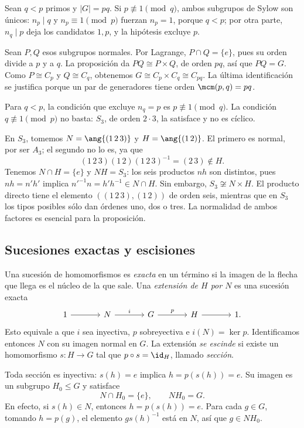 \begin{ejem}
Sean $q<p$ primos y $|G|=pq$. Si \mbox{$p\not\equiv1\pmod q$}, ambos subgrupos de Sylow son únicos: $n_p\mid q$ y $n_p\equiv1\pmod p$ fuerzan $n_p=1$, porque $q<p$; por otra parte, $n_q\mid p$ deja los candidatos $1,p$, y la hipótesis excluye $p$.

Sean $P,Q$ esos subgrupos normales. Por Lagrange, $P\cap Q=\{e\}$, pues su orden divide a $p$ y a $q$. La proposición da $PQ\cong P\times Q$, de orden $pq$, así que $PQ=G$. Como $P\cong C_p$ y $Q\cong C_q$, obtenemos $G\cong C_p\times C_q\cong C_{pq}$. La última identificación se justifica porque un par de generadores tiene orden $\mcm(p,q)=pq$.
\end{ejem}
\begin{obs}
Para $q<p$, la condición que excluye $n_q=p$ es $p\not\equiv1\pmod q$. La condición $q\not\equiv1\pmod p$ no basta: $S_3$, de orden $2\cdot3$, la satisface y no es cíclico.
\end{obs}

\begin{ejem}
En $S_3$, tomemos $N=\ang{(1\,2\,3)}$ y $H=\ang{(1\,2)}$. El primero es normal, por ser $A_3$; el segundo no lo es, ya que
\[
(1\,2\,3)(1\,2)(1\,2\,3)^{-1}=(2\,3)\notin H.
\]
Tenemos $N\cap H=\{e\}$ y $NH=S_3$: los seis productos $nh$ son distintos, pues $nh=n'h'$ implica $n'^{-1}n=h'h^{-1}\in N\cap H$. Sin embargo, $S_3\not\cong N\times H$. El producto directo tiene el elemento $((1\,2\,3),(1\,2))$ de orden seis, mientras que en $S_3$ los tipos posibles sólo dan órdenes uno, dos o tres. La normalidad de ambos factores es esencial para la proposición.
\end{ejem}

\subsection{Sucesiones exactas y escisiones}
\begin{defi}
Una sucesión de homomorfismos es \emph{exacta} en un término si la imagen de la flecha que llega es el núcleo de la que sale. Una \emph{extensión de $H$ por $N$} es una sucesión exacta
\[
\begin{tikzcd}[column sep=large]
1\arrow[r]&N\arrow[r,"i"]&G\arrow[r,"p"]&H\arrow[r]&1.
\end{tikzcd}
\]
Esto equivale a que $i$ sea inyectiva, $p$ sobreyectiva e $i(N)=\ker p$. Identificamos entonces $N$ con su imagen normal en $G$. La extensión \emph{se escinde} si existe un homomorfismo $s:H\to G$ tal que $p\circ s=\id_H$, llamado \emph{sección}.
\end{defi}
Toda sección es inyectiva: $s(h)=e$ implica $h=p(s(h))=e$. Su imagen es un subgrupo $H_0\le G$ y satisface
\[
N\cap H_0=\{e\},\qquad NH_0=G.
\]
En efecto, si $s(h)\in N$, entonces $h=p(s(h))=e$. Para cada $g\in G$, tomando $h=p(g)$, el elemento $gs(h)^{-1}$ está en $N$, así que $g\in NH_0$.

